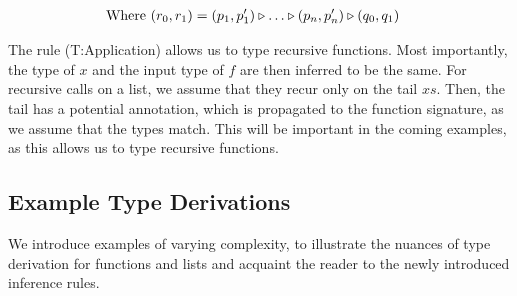 \begin{align*}
   \text{Where }  & (r_0, r_1) = (p_1, p_1') \triangleright \dots \triangleright (p_n, p_n') \triangleright (q_0, q_1)
\end{align*}

The rule (T:Application) allows us to type recursive functions. Most importantly, the type of \(x\) and the input type of \(f\) are then inferred to be the same. For recursive calls on a list, we assume that they recur only on the tail \(xs\). Then, the tail has a potential annotation, which is propagated to the function signature, as we assume that the types match. This will be important in the coming examples, as this allows us to type recursive functions.

\subsection{Example Type Derivations}\label{sec:example-type-derivations}

We introduce examples of varying complexity, to illustrate the nuances of type derivation for functions and lists and acquaint the reader to the newly introduced inference rules.

